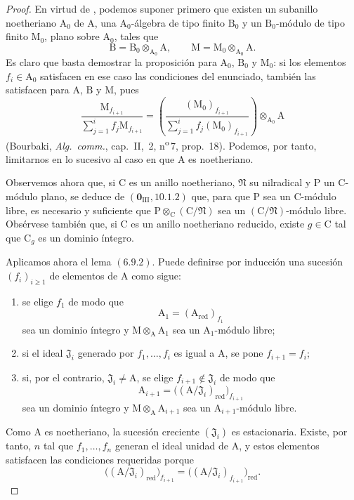 \begin{proof}
En virtud de , podemos suponer primero que existen un subanillo noetheriano $\mathrm{A}_0$ de $\mathrm{A}$, una $\mathrm{A}_0$-álgebra de tipo finito $\mathrm{B}_0$ y un $\mathrm{B}_0$-módulo de tipo finito $\mathrm{M}_0$, plano sobre $\mathrm{A}_0$, tales que
\[
  \mathrm{B}=\mathrm{B}_0\otimes_{\mathrm{A}_0}\mathrm{A},
  \qquad
  \mathrm{M}=\mathrm{M}_0\otimes_{\mathrm{A}_0}\mathrm{A}.
\]
Es claro que basta demostrar la proposición para $\mathrm{A}_0$, $\mathrm{B}_0$ y $\mathrm{M}_0$: si los elementos $f_i\in\mathrm{A}_0$ satisfacen en ese caso las condiciones del enunciado, también las satisfacen para $\mathrm{A}$, $\mathrm{B}$ y $\mathrm{M}$, pues
\[
  \frac{\mathrm{M}_{f_{i+1}}}
       {\sum_{j=1}^{i}f_j\mathrm{M}_{f_{i+1}}}
  =
  \left(
    \frac{(\mathrm{M}_0)_{f_{i+1}}}
         {\sum_{j=1}^{i}f_j(\mathrm{M}_0)_{f_{i+1}}}
  \right)\otimes_{\mathrm{A}_0}\mathrm{A}
\]
(Bourbaki, \emph{Alg.\ comm.}, cap.~II, \textsection\,2, n\textsuperscript{o}\,7, prop.~18). Podemos, por tanto, limitarnos en lo sucesivo al caso en que $\mathrm{A}$ es noetheriano.

Observemos ahora que, si $\mathrm{C}$ es un anillo noetheriano, $\mathfrak{N}$ su nilradical y $\mathrm{P}$ un $\mathrm{C}$-módulo plano, se deduce de $(\mathbf{0}_{\mathrm{III}},10.1.2)$ que, para que $\mathrm{P}$ sea un $\mathrm{C}$-módulo libre,  es necesario y suficiente que $\mathrm{P}\otimes_\mathrm{C}(\mathrm{C}/\mathfrak{N})$ sea un $(\mathrm{C}/\mathfrak{N})$-módulo libre. Obsérvese también que, si $\mathrm{C}$ es un anillo noetheriano reducido, existe $g\in\mathrm{C}$ tal que $\mathrm{C}_g$ es un dominio íntegro.

Aplicamos ahora el lema $(6.9.2)$. Puede definirse por inducción una sucesión $(f_i)_{i\geqslant1}$ de elementos de $\mathrm{A}$ como sigue:
\begin{enumerate}
\item[$1^\circ$] se elige $f_1$ de modo que
\[
  \mathrm{A}_1=(\mathrm{A}_{\mathrm{red}})_{f_1}
\]
sea un dominio íntegro y $\mathrm{M}\otimes_\mathrm{A}\mathrm{A}_1$ sea un $\mathrm{A}_1$-módulo libre;
\item[$2^\circ$] si el ideal $\mathfrak{J}_i$ generado por $f_1,\ldots,f_i$ es igual a $\mathrm{A}$, se pone $f_{i+1}=f_i$;
\item[$3^\circ$] si, por el contrario, $\mathfrak{J}_i\neq\mathrm{A}$, se elige $f_{i+1}\notin\mathfrak{J}_i$ de modo que
\[
  \mathrm{A}_{i+1}
  =\bigl((\mathrm{A}/\mathfrak{J}_i)_{\mathrm{red}}\bigr)_{f_{i+1}}
\]
sea un dominio íntegro y $\mathrm{M}\otimes_\mathrm{A}\mathrm{A}_{i+1}$ sea un $\mathrm{A}_{i+1}$-módulo libre.
\end{enumerate}
Como $\mathrm{A}$ es noetheriano, la sucesión creciente $(\mathfrak{J}_i)$ es estacionaria. Existe, por tanto, $n$ tal que $f_1,\ldots,f_n$ generan el ideal unidad de $\mathrm{A}$, y estos elementos satisfacen las condiciones requeridas porque
\[
  \bigl((\mathrm{A}/\mathfrak{J}_i)_{\mathrm{red}}\bigr)_{f_{i+1}}
  =
  \bigl((\mathrm{A}/\mathfrak{J}_i)_{f_{i+1}}\bigr)_{\mathrm{red}}.
\]
\end{proof}

